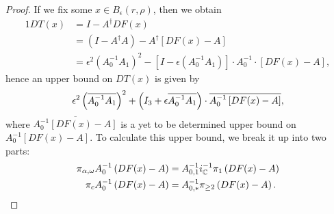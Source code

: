 \begin{proof}
	
	
	If we fix some $x \in B_\epsilon(r,\rho)$, then we obtain 
\begin{alignat*}{1}
		D T( x ) &=  I - A^{\dagger}  D F( x)  \\
		&= ( I - A^{\dagger} A) - A^{\dagger} \left[ D F( x)  - A \right]\\
		&=   \epsilon^2 (A_0^{-1} A_1 )^2 -    [I - \epsilon (A_0^{-1} A_1 ) ] \cdot  A_0^{-1} \cdot   \left[ D F( x) - A \right] ,
\end{alignat*}
hence an upper bound on $DT(x)$ is given by
\begin{equation*}
\epsilon^2  \left(\overline{ A_0^{-1} A_1 }\right)^2  + 
\left(I_3 + \epsilon \overline{ A_0^{-1} A_1 } \right) \cdot 
\overline{A_0^{-1}  \left[D F( x ) - A \right] },
\end{equation*}
	where $\overline{A_0^{-1}  \left[D F( x ) - A \right] }$ is a yet to be determined upper bound on $A_0^{-1}  \left[D F( x ) - A \right]$.  
To calculate this upper bound, we break it up into two parts: 
	\begin{alignat}{1}
		\pi_{\alpha,\omega} A_0^{-1}  \left( D F( x) - A \right)  &= 
		A_{0,1}^{-1}  i_{\mathbb{C}}^{-1} \pi_1   \left( D F( x) - A \right) 
\label{eq:Zfinite}\\ 
		\pi_c 		A_0^{-1}  \left( D F( x) - A \right)  &=
		A_{0,*}^{-1}  \pi_{\geq 2} \left( DF(x) - A \right)  . \label{eq:Zstar} 
\end{alignat}
	

\end{proof}
